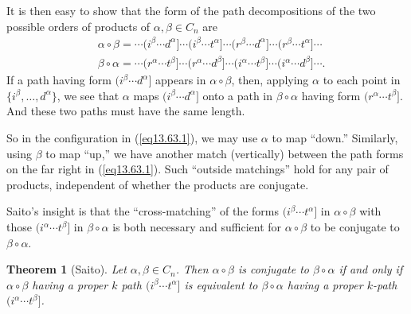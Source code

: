 \documentclass{surv-l}
\numberwithin{equation}{section}
\numberwithin{table}{section}
\numberwithin{figure}{section}
\newtheorem{theorem}[equation]{Theorem}
\theoremstyle{definition}
\begin{document}
It is then easy to show that the form of the
path decompositions of the two possible orders
of products of $\alpha,\beta\in C_{n}$ are
\begin{equation}\label{eq13.63.1}
\begin{split}
&\alpha \circ\beta=\cdots(i^{\beta}\cdots d^{\alpha}]
\cdots(i^{\beta}\cdots t^{\alpha}]\cdots(r^{\beta}\cdots d^{\alpha}]
\cdots(r^{\beta}\cdots t^{\alpha}]\cdots \\
&\beta \circ\alpha=\cdots(r^{\alpha}\cdots t^{\beta}]\cdots(r^{\alpha}
\cdots d^{\beta}]\cdots(i^{\alpha}\cdots t^{\beta}]\cdots(i^{\alpha}\cdots d^{\beta}]\cdots.
\end{split}
\end{equation}
If a path having form $(i^{\beta}\cdots d^{\alpha}]$ appears
in $\alpha\circ\beta$, then, applying $\alpha$ to each point
in $\{i^{\beta},\ldots, d^{\alpha}\}$, we see that $\alpha$
maps $(i^{\beta}\cdots d^{\alpha}]$ onto a path in $\beta
\circ\alpha$ having form $(r^{\alpha}\cdots t^{\beta}]$. And
these two paths must have the same length.

So in the configuration in (\ref{eq13.63.1}), we may use $\alpha$
to map ``down.'' Similarly, using $\beta$ to map ``up,'' we have
another match (vertically) between the path forms on the far right
in (\ref{eq13.63.1}). Such ``outside matchings'' hold for any pair
of products, independent of whether the products are conjugate.

Saito's insight is that the ``cross-matching'' of the forms
$(i^{\beta}\cdots t^{\alpha}]$ in $\alpha \circ\beta$ with those
$(i^{\alpha}\cdots t^{\beta}]$ in $\beta \circ\alpha$ is both
necessary and sufficient for $\alpha \circ\beta$ to be conjugate
to $\beta \circ\alpha$.

\begin{theorem}[Saito]\label{thm13.63.2}
Let $\alpha,\beta\in C_{n}$. Then $\alpha \circ\beta$ is
conjugate to $\beta \circ\alpha$ if and only if
$\alpha\circ\beta$ having a proper $k$ path $(i^{\beta}\cdots
t^{\alpha}]$ is equivalent to $\beta \circ\alpha$ having a
proper $k$-path $(i^{\alpha}\cdots t^{\beta}]$.
\end{theorem}
\end{document}

